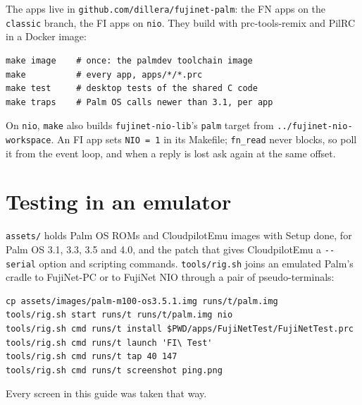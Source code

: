 \documentclass[11pt,letterpaper,openany]{book}
\begin{document}
The apps live in \texttt{github.com/dillera/fujinet-palm}: the FN apps on the
\texttt{classic} branch, the FI apps on \texttt{nio}. They build with
prc-tools-remix and PilRC in a Docker image:

\begin{codebox}
\begin{verbatim}
make image    # once: the palmdev toolchain image
make          # every app, apps/*/*.prc
make test     # desktop tests of the shared C code
make traps    # Palm OS calls newer than 3.1, per app
\end{verbatim}
\end{codebox}

On \texttt{nio}, \texttt{make} also builds \texttt{fujinet-nio-lib}'s
\texttt{palm} target from \texttt{../fujinet-nio-workspace}. An FI app sets
\texttt{NIO = 1} in its Makefile; \texttt{fn\_read} never blocks, so poll it
from the event loop, and when a reply is lost ask again at the same offset.

\section{Testing in an emulator}

\texttt{assets/} holds Palm OS ROMs and CloudpilotEmu images with Setup done,
for Palm OS 3.1, 3.3, 3.5 and 4.0, and the patch that gives CloudpilotEmu a
\texttt{-{}-serial} option and scripting commands. \texttt{tools/rig.sh} joins
an emulated Palm's cradle to FujiNet-PC or to FujiNet NIO through a pair of
pseudo-terminals:

\begin{codebox}
\begin{verbatim}
cp assets/images/palm-m100-os3.5.1.img runs/t/palm.img
tools/rig.sh start runs/t runs/t/palm.img nio
tools/rig.sh cmd runs/t install $PWD/apps/FujiNetTest/FujiNetTest.prc
tools/rig.sh cmd runs/t launch 'FI\ Test'
tools/rig.sh cmd runs/t tap 40 147
tools/rig.sh cmd runs/t screenshot ping.png
\end{verbatim}
\end{codebox}

Every screen in this guide was taken that way.
\end{document}

